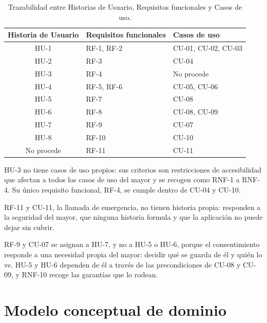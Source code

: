 \begin{table}[htbp]
    \centering
    \caption{Trazabilidad entre Historias de Usuario, Requisitos funcionales y Casos de uso.}
    \label{tab:trazabilidad}
    \begin{tabularx}{\textwidth}{@{}c >{\RaggedRight\arraybackslash}X >{\RaggedRight\arraybackslash}X@{}}
        \toprule
        \textbf{Historia de Usuario} & \textbf{Requisitos funcionales} & \textbf{Casos de uso} \\
        \midrule
        HU-1 & RF-1, RF-2                & CU-01, CU-02, CU-03 \\
        HU-2 & RF-3                      & CU-04 \\
        HU-3 & RF-4                      & No procede \\
        HU-4 & RF-5, RF-6                & CU-05, CU-06 \\
        HU-5 & RF-7                      & CU-08 \\
        HU-6 & RF-8                      & CU-08, CU-09 \\
        HU-7 & RF-9                      & CU-07 \\
        HU-8 & RF-10                     & CU-10 \\
        No procede & RF-11               & CU-11 \\
        \bottomrule
    \end{tabularx}

\end{table}

HU-3 no tiene casos de uso propios: sus criterios son restricciones de accesibilidad que afectan a todos los casos de uso del mayor y se recogen como RNF-1 a RNF-4. Su único requisito funcional, RF-4, se cumple dentro de CU-04 y CU-10.

RF-11 y CU-11, la llamada de emergencia, no tienen historia propia: responden a la seguridad del mayor, que ninguna historia formula y que la aplicación no puede dejar sin cubrir.

RF-9 y CU-07 se asignan a HU-7, y no a HU-5 o HU-6, porque el consentimiento responde a una necesidad propia del mayor: decidir qué se guarda de él y quién lo ve. HU-5 y HU-6 dependen de él a través de las precondiciones de CU-08 y CU-09, y RNF-10 recoge las garantías que lo rodean.

\section{Modelo conceptual de dominio}

